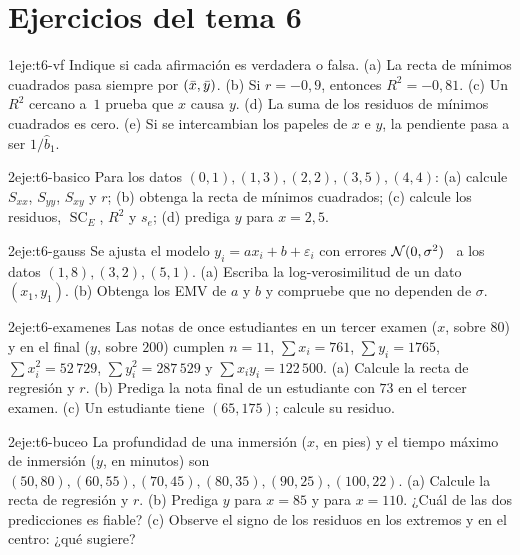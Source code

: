 \section*{Ejercicios del tema 6}

\begin{ejercicio}{1}{eje:t6-vf}
Indique si cada afirmación es verdadera o falsa. (a) La recta de mínimos cuadrados pasa siempre por $(\bar{x},\bar{y})$. (b) Si $r=-0{,}9$, entonces $R^{2}=-0{,}81$. (c) Un $R^{2}$ cercano a~$1$ prueba que $x$ causa $y$. (d) La suma de los residuos de mínimos cuadrados es cero. (e) Si se intercambian los papeles de $x$ e $y$, la pendiente pasa a ser $1/\widehat b_1$.
\end{ejercicio}

\begin{ejercicio}{2}{eje:t6-basico}
Para los datos $(0,1),(1,3),(2,2),(3,5),(4,4)$: (a) calcule $S_{xx}$, $S_{yy}$, $S_{xy}$ y $r$; (b) obtenga la recta de mínimos cuadrados; (c) calcule los residuos, $\operatorname{SC}_E$, $R^{2}$ y $s_e$; (d) prediga $y$ para $x=2{,}5$.
\end{ejercicio}

\begin{ejercicio}{2}{eje:t6-gauss}
Se ajusta el modelo $y_i=ax_i+b+\varepsilon_i$ con errores $\mathcal{N}(0,\sigma^{2})$ \iid\ a los datos $(1,8),(3,2),(5,1)$. (a) Escriba la log-verosimilitud de un dato $(x_1,y_1)$. (b) Obtenga los EMV de $a$ y $b$ y compruebe que no dependen de $\sigma$.
\end{ejercicio}

\begin{ejercicio}{2}{eje:t6-examenes}
Las notas de once estudiantes en un tercer examen ($x$, sobre $80$) y en el final ($y$, sobre $200$) cumplen $n=11$, $\sum x_i=761$, $\sum y_i=1765$, $\sum x_i^{2}=52\,729$, $\sum y_i^{2}=287\,529$ y $\sum x_iy_i=122\,500$. (a) Calcule la recta de regresión y $r$. (b) Prediga la nota final de un estudiante con $73$ en el tercer examen. (c) Un estudiante tiene $(65,175)$; calcule su residuo.
\end{ejercicio}

\begin{ejercicio}{2}{eje:t6-buceo}
La profundidad de una inmersión ($x$, en pies) y el tiempo máximo de inmersión ($y$, en minutos) son $(50,80),(60,55),(70,45),(80,35),(90,25),(100,22)$. (a) Calcule la recta de regresión y $r$. (b) Prediga $y$ para $x=85$ y para $x=110$. ¿Cuál de las dos predicciones es fiable? (c) Observe el signo de los residuos en los extremos y en el centro: ¿qué sugiere?
\end{ejercicio}

